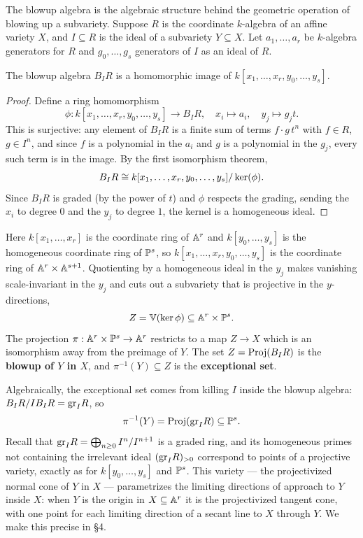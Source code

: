 \documentclass[11pt]{article}
\begin{document}
The blowup algebra is the algebraic structure behind the geometric operation of blowing up a subvariety. Suppose $R$ is the coordinate $k$-algebra of an affine variety $X$, and $I \subseteq R$ is the ideal of a subvariety $Y \subseteq X$. Let $a_1, \ldots, a_r$ be $k$-algebra generators for $R$ and $g_0, \ldots, g_s$ generators of $I$ as an ideal of $R$.

\begin{proposition}\label{prop:blowimage}
    The blowup algebra $B_I R$ is a homomorphic image of $k[x_1, \ldots, x_r, y_0, \ldots, y_s]$.
\end{proposition}

\begin{proof}
    Define a ring homomorphism
    \[\phi: k[x_1, \ldots, x_r, y_0, \ldots, y_s] \to B_I R, \quad x_i \mapsto a_i, \quad y_j \mapsto g_j t.\]
    This is surjective: any element of $B_I R$ is a finite sum of terms $f \cdot g\,t^n$ with $f \in R$, $g \in I^n$, and since $f$ is a polynomial in the $a_i$ and $g$ is a polynomial in the $g_j$, every such term is in the image. By the first isomorphism theorem,
    \[B_I R \iso k[x_1, \ldots, x_r, y_0, \ldots, y_s] / \ker(\phi).\]
    Since $B_I R$ is graded (by the power of $t$) and $\phi$ respects the grading, sending the $x_i$ to degree $0$ and the $y_j$ to degree $1$, the kernel is a homogeneous ideal.
\end{proof}

Here $k[x_1,\ldots,x_r]$ is the coordinate ring of $\A^r$ and $k[y_0, \ldots, y_s]$ is the homogeneous coordinate ring of $\P^s$, so $k[x_1, \ldots, x_r, y_0, \ldots, y_s]$ is the coordinate ring of $\A^r \times \A^{s+1}$. Quotienting by a homogeneous ideal in the $y_j$ makes vanishing scale-invariant in the $y_j$ and cuts out a subvariety that is projective in the $y$-directions,
\[Z = \V(\ker \phi) \subseteq \A^r \times \P^s.\]
The projection $\pi: \A^r \times \P^s \to \A^r$ restricts to a map $Z \to X$ which is an isomorphism away from the preimage of $Y$. The set $Z = \Proj(B_I R)$ is the \textbf{blowup of $Y$ in $X$}, and $\pi^{-1}(Y) \subseteq Z$ is the \textbf{exceptional set}.

Algebraically, the exceptional set comes from killing $I$ inside the blowup algebra: $B_I R / I B_I R = \gr_I R$, so
\[\pi^{-1}(Y) = \Proj(\gr_I R) \subseteq \P^s.\]
Recall that $\gr_I R = \bigoplus_{n \geq 0} I^n/I^{n+1}$ is a graded ring, and its homogeneous primes not containing the irrelevant ideal $(\gr_I R)_{>0}$ correspond to points of a projective variety, exactly as for $k[y_0,\ldots,y_s]$ and $\P^s$. This variety --- the projectivized normal cone of $Y$ in $X$ --- parametrizes the limiting directions of approach to $Y$ inside $X$: when $Y$ is the origin in $X \subseteq \A^r$ it is the projectivized tangent cone, with one point for each limiting direction of a secant line to $X$ through $Y$. We make this precise in \S4.
\end{document}
